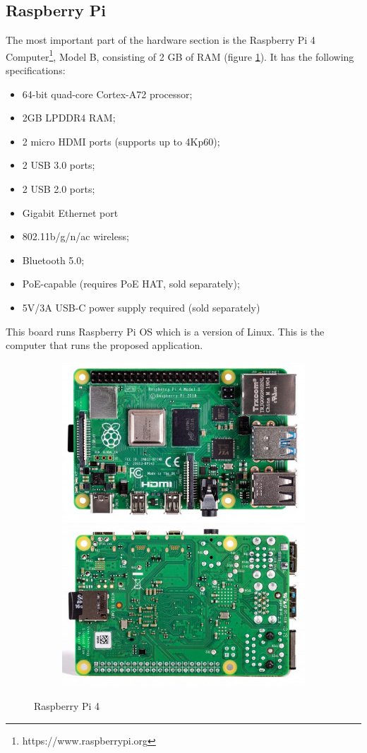 \documentclass[runningheads,a4paper,12pt]{report}
\begin{document}
\subsection*{Raspberry Pi}
The most important part of the hardware section is the Raspberry Pi 4 Computer\footnote{https://www.raspberrypi.org}, Model B, consisting of 2 GB of RAM (figure \ref{fig:raspi}). It has the following specifications:
\begin{multicols}{2}
\begin{itemize}
\item 64-bit quad-core Cortex-A72 processor;
\item 2GB LPDDR4 RAM;
\item 2 micro HDMI ports (supports up to 4Kp60);
\item 2 USB 3.0 ports;
\item 2 USB 2.0 ports;
\item Gigabit Ethernet port
\item 802.11b/g/n/ac wireless;
\item Bluetooth 5.0;
\item PoE-capable (requires PoE HAT, sold separately);
\item 5V/3A USB-C power supply required (sold separately)
\end{itemize}
\end{multicols}

This board runs Raspberry Pi OS which is a version of Linux. This is the computer that runs the proposed application. 

\begin{figure}
	\centering
	
	\begin{subfigure}{\linewidth}
  		\includegraphics[width=.45\linewidth]{./images/3_raspberrypi1}\hfill
  		\includegraphics[width=.45\linewidth]{./images/3_raspberrypi2}
  	\end{subfigure}
    
    \caption{Raspberry Pi 4}  
    \label{fig:raspi}
\end{figure}
\end{document}
